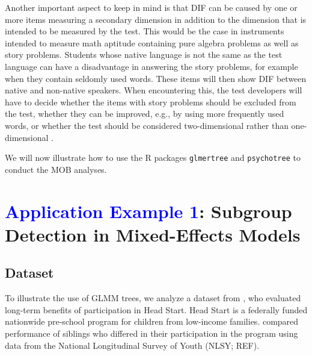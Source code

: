 \documentclass[doc,floatsintext,natbib]{apa7}
\newcommand{\edc}[1]{\textcolor{blue}{#1}}
\begin{document}
Another important aspect to keep in mind is that DIF can be caused by one or more items measuring a secondary dimension in addition to the dimension that is intended to be measured by the test. This would be the case in instruments intended to measure math aptitude containing pure algebra problems as well as story problems. Students whose native language is not the same as the test language can have a disadvantage in answering the story problems, for example when they contain seldomly used words. These items will then show DIF between native and non-native speakers. When encountering this, the test developers will have to decide whether the items with story problems should be excluded from the test, whether they can be improved, e.g., by using more frequently used words, or whether the test should be considered two-dimensional rather than one-dimensional \citep[see also][for a discussion of the connection between DIF and multidimensionality]{Ack:1992,Stretal:2021:APM}.

We will now illustrate how to use the R packages \texttt{glmertree} and \texttt{psychotree} to conduct the MOB analyses. 




\newpage
\section{\edc{Application Example 1}: Subgroup Detection in Mixed-Effects Models}
\label{sec:TutorialMixed}



\subsection{Dataset}

To illustrate the use of GLMM trees, we analyze a dataset from \cite{Demi09}, who evaluated long-term benefits of participation in Head Start. Head Start is a federally funded nationwide  pre-school program for children from low-income families. \cite{Demi09} compared performance of siblings who differed in their participation in the program using data from the National Longitudinal Survey of Youth (NLSY; REF). 
\end{document}
